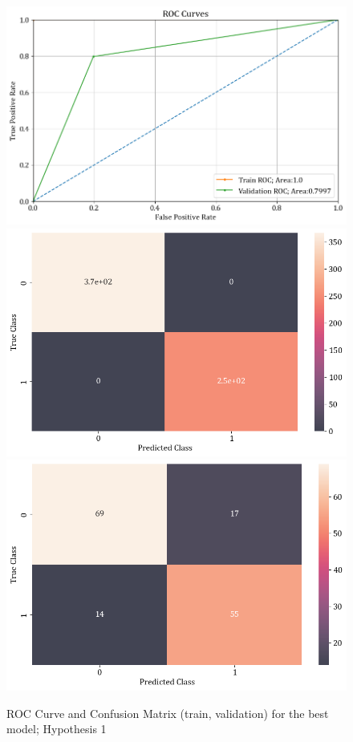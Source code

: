 \documentclass[11pt,a4paper]{article}
\begin{document}
\begin{figure}[H]
	\centering
	\includegraphics[scale=0.26]{images/H1_roc_corve.png}
	\includegraphics[scale=0.26]{images/H1_confusion_matrix.png}
	\includegraphics[scale=0.26]{images/H1_confusion_matrix_val_test.png}
	\caption{ROC Curve and Confusion Matrix (train, validation) for the best model; Hypothesis 1}
	\label{fig:H1_roc_conf}
\end{figure}
\end{document}
